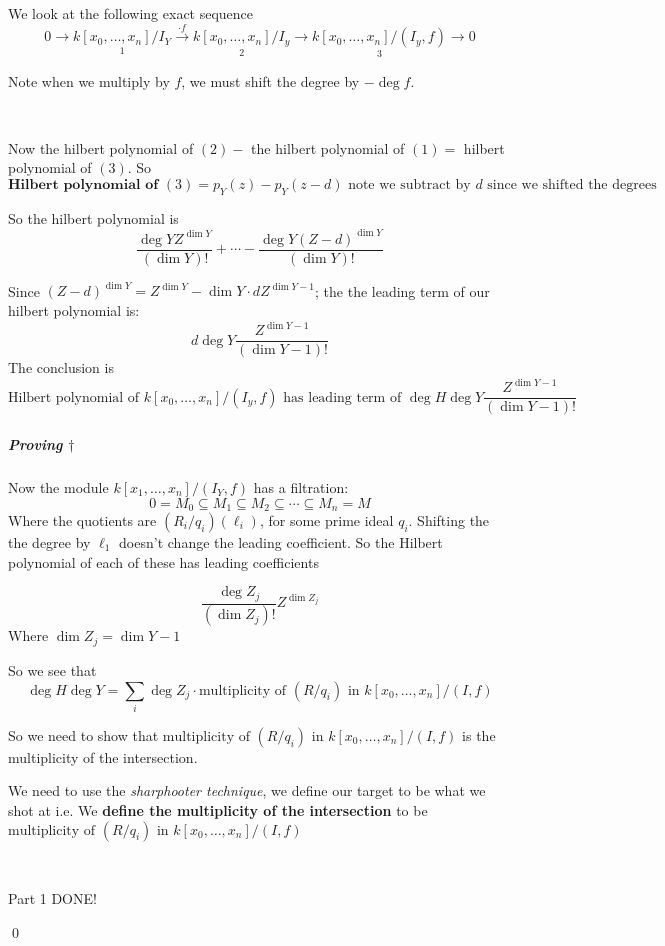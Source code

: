 We look at the following exact sequence\[
0\rightarrow \underset{1}{k[x_0,\ldots,x_n]/I_Y} \overset{\cdot f}{\rightarrow} \underset{2}{k[x_0,\ldots, x_n]/I_y}\rightarrow \underset{3}{k[x_0,\ldots, x_n]/(I_y, f)}\rightarrow 0
\]

Note when we multiply by $f$, we must shift the degree by $-\deg f$.

\

Now the hilbert polynomial of $(2) - $ the hilbert polynomial of $(1) = $ hilbert polynomial of $(3)$. So \[
    \textbf{Hilbert polynomial of }(3) = p_Y(z) - p_Y(z-d) \text{ note we subtract by }d\text{ since we shifted the degrees}    
\]

So the hilbert polynomial is \[\frac{\deg Y Z^{\dim Y}}{(\dim Y)!} + \cdots - \frac{\deg Y {(Z-d)}^{\dim Y}}{(\dim Y)!} \]


Since ${(Z-d)}^{\dim Y} = Z^{\dim Y} - \dim Y\cdot dZ^{\dim Y - 1}$; the the leading term of our hilbert polynomial is:\[
    d\deg Y \frac{Z^{\dim Y - 1}}{(\dim Y - 1)!}   
\]
The conclusion is \[
\text{Hilbert polynomial of }k[x_0,\ldots, x_n]/(I_y, f)\text{ has leading term of }\deg H \deg Y\frac{Z^{\dim Y - 1}}{(\dim Y - 1)!}
\]

\subparagraph*{Proving $\dagger$}

Now the module $k[x_1,\ldots,x_n]/(I_Y,f)$ has a filtration:\[
    0 = M_0\subseteq M_1\subseteq M_2\subseteq \cdots \subseteq M_n = M    
\]
Where the quotients are $(R_i/q_i) (\ell_i)$, for some prime ideal $q_i$. Shifting the the degree by $\ell_1$ doesn't change the leading coefficient. So the Hilbert polynomial of each of these has leading coefficients

\[\frac{\deg Z_j}{(\dim Z_j)!}Z^{\dim Z_j} \] Where $\dim Z_j = \dim Y - 1$


So we see that \[
    \deg H \deg Y = \sum_{i}\deg Z_j \cdot\text{multiplicity of }(R/q_i) \text{ in }k[x_0,\ldots,x_n]/(I,f)    
\]

So we need to show that $\text{multiplicity of }(R/q_i) \text{ in }k[x_0,\ldots,x_n]/(I,f)$ is the multiplicity of the intersection.

We need to use the \textit{sharphooter technique}\texttrademark, we define our target to be what we shot at i.e. We \textbf{define the multiplicity of the intersection} to be $\text{multiplicity of }(R/q_i) \text{ in }k[x_0,\ldots,x_n]/(I,f)$ 


\

\begin{center}
    \Large{Part 1 DONE!}

    \qed
\end{center}




